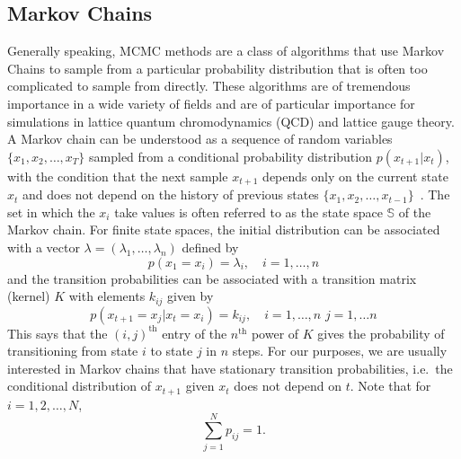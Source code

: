 \documentclass[../main.tex]{subfiles}
\begin{document}
\subsection{Markov Chains}
Generally speaking, MCMC methods are a class of algorithms that use Markov Chains to sample from a particular
probability distribution that is often too complicated to sample from directly.
%
These algorithms are of tremendous importance in a wide variety of fields and are of particular importance for
simulations in lattice quantum chromodynamics (QCD) and lattice gauge theory.
%
A Markov chain can be understood as a sequence of random variables ${\{x_1, x_2, \ldots, x_T\}}$ sampled from a
conditional probability distribution $p{(x_{t+1}|x_t)}$, with the condition that the next sample $x_{t+1}$ depends only
on the current state $x_t$ and does not depend on the history of previous states ${\{x_1, x_2, \ldots,
x_{t-1}\}}$~\cite{brooks2011handbook}.
%
The set in which the $x_i$ take values is often referred to as the state space $\mathbb{S}$ of the Markov chain.
%
For finite state spaces, the initial distribution can be associated with a vector $\lambda= {(\lambda_1, \ldots,
\lambda_n)}$ defined by
%
\begin{equation}
  p(x_1 = x_i) = \lambda_i, \quad i = 1, \ldots, n
\end{equation}
%
and the transition probabilities can be associated with a transition matrix (kernel) $K$ with elements $k_{ij}$ given
by \begin{equation}
  p(x_{t+1} = x_j | x_t = x_i) = k_{ij}, \quad i = 1, \ldots, n \,\, j = 1, \ldots n
\end{equation}
This says that the ${(i, j)}^{\mathrm{th}}$ entry of the $n^{\mathrm{th}}$ power of $K$ gives the probability of
transitioning from state $i$ to state $j$ in $n$ steps.
%
For our purposes, we are usually interested in Markov chains that have stationary transition probabilities, i.e.\ the
conditional distribution of $x_{t+1}$ given $x_t$ does not depend on $t$. Note that for $i = 1, 2, \ldots, N$,
\begin{equation}
  \sum_{j=1}^{N} p_{ij} = 1.
\end{equation}
\end{document}
